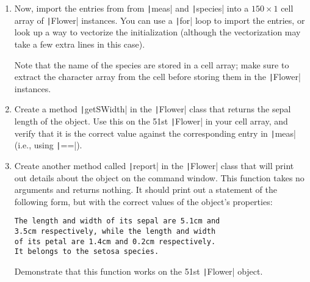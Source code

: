 \documentclass{article}
\begin{document}
\begin{enumerate}
\begin{enumerate}
    \clearpage
  \item Now, import the entries from from \texttt|meas| and \texttt|species| into a $150\times 1$ cell array of \texttt|Flower| instances. You can use a \texttt|for| loop to import the entries, or look up a way to vectorize the initialization (although the vectorization may take a few extra lines in this case).

    Note that the name of the species are stored in a cell array; make sure to extract the character array from the cell before storing them in the \texttt|Flower| instances.

  \item Create a method \texttt|getSWidth| in the \texttt|Flower| class that returns the sepal length of the object. Use this on the 51st \texttt|Flower| in your cell array, and verify that it is the correct value against the corresponding entry in \texttt|meas| (i.e., using \texttt|==|).

  \item Create another method called \texttt|report| in the \texttt|Flower| class that will print out details about the object on the command window. This function takes no arguments and returns nothing. It should print out a statement of the following form, but with the correct values of the object's properties:
\begin{verbatim}
The length and width of its sepal are 5.1cm and
3.5cm respectively, while the length and width
of its petal are 1.4cm and 0.2cm respectively.
It belongs to the setosa species.
\end{verbatim}
    Demonstrate that this function works on the 51st \texttt|Flower| object.
  \end{enumerate}
\end{enumerate}
\end{document}
